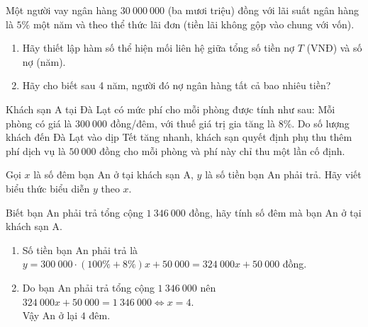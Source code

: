 \begin{bt}%
	Một người vay ngân hàng $30~000~000$ (ba mươi triệu) đồng với lãi suất ngân hàng là $5 \%$ một năm và theo thể thức lãi đơn (tiền lãi không gộp vào chung với vốn).
	\begin{enumerate}
		\item Hãy thiết lập hàm số thể hiện mối liên hệ giữa tổng số tiền nợ $T$ (VNĐ) và số nợ (năm).
		\item Hãy cho biết sau 4 năm, người đó nợ ngân hàng tất cả bao nhiêu tiền?
	\end{enumerate}
\end{bt}


\begin{bt}%
	Khách sạn A tại Đà Lạt có mức phí cho mỗi phòng được tính như sau: Mỗi phòng có giá là $300\ 000$ đồng/đêm, với thuế giá trị gia tăng là $8\%$. Do số lượng khách đến Đà Lạt vào dịp Tết tăng nhanh, khách sạn quyết định phụ thu thêm phí dịch vụ là $50\ 000$ đồng cho mỗi phòng và phí này chỉ thu một lần cố định.
	\begin{listEX}[1]
		\item Gọi $x$ là số đêm bạn An ở tại khách sạn A, $y$ là số tiền bạn An phải trả. Hãy viết biểu thức biểu diễn $y$ theo $x$.
		\item Biết bạn An phải trả tổng cộng $1\ 346\ 000$ đồng, hãy tính số đêm mà bạn An ở tại khách sạn A.
	\end{listEX}
	\loigiai
	{
		\begin{enumerate}
			\item Số tiền bạn An phải trả là $y=300\ 000\cdot (100\%+8\%)x+50\ 000=324\ 000x+50\ 000$ đồng.
			\item Do bạn An phải trả tổng cộng $1\ 346\ 000$ nên $324\ 000x+50\ 000=1\ 346\ 000\Leftrightarrow x=4$.\\
			      Vậy An ở lại $4$ đêm.
		\end{enumerate}
	}
\end{bt}


